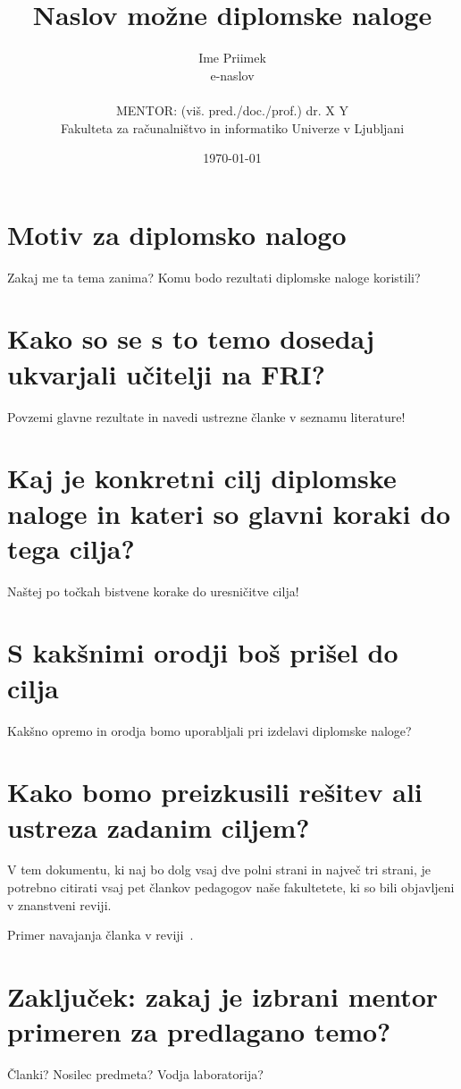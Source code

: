 \documentclass[11pt,a4paper]{article}
\title{Naslov možne diplomske naloge}
\author{Ime Priimek\\
e-naslov\\
\ \\
MENTOR: (viš. pred./doc./prof.) dr. X Y \\
Fakulteta za računalništvo in informatiko Univerze v Ljubljani
\date{\today}         
}
\begin{document}
\maketitle

\section{Motiv za diplomsko nalogo}

Zakaj me ta tema zanima? Komu bodo rezultati diplomske naloge koristili?


\section{Kako so se s to temo dosedaj ukvarjali učitelji na FRI?}

Povzemi glavne rezultate in navedi ustrezne članke v seznamu literature!


\section{Kaj je konkretni cilj diplomske naloge in kateri so glavni koraki do tega cilja?}

Naštej po točkah bistvene korake do uresničitve cilja!


\section{S kakšnimi orodji boš prišel do cilja}

Kakšno opremo in orodja bomo uporabljali pri izdelavi diplomske naloge?


\section{Kako bomo preizkusili rešitev ali ustreza zadanim ciljem?}

V tem dokumentu, ki naj bo dolg vsaj dve polni strani in največ tri strani, je potrebno citirati vsaj pet člankov pedagogov naše fakultetete, ki so bili objavljeni v znanstveni reviji.

Primer navajanja članka v reviji~\cite{ravnik2013audience}.


\section{Zaključek: zakaj je izbrani mentor primeren za predlagano temo?}

Članki? Nosilec predmeta? Vodja laboratorija?



\end{document}
